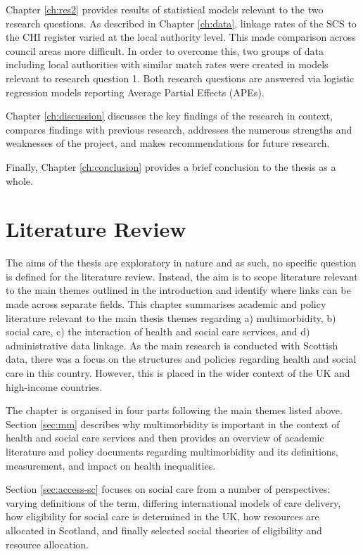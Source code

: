 \documentclass[12pt,a4paper,oneside,table]{report}
\begin{document}
Chapter \ref{ch:res2} provides results of statistical models relevant to
the two research questions. As described in Chapter \ref{ch:data},
linkage rates of the SCS to the CHI register varied at the local
authority level. This made comparison across council areas more
difficult. In order to overcome this, two groups of data including local
authorities with similar match rates were created in models relevant to
research question 1. Both research questions are answered via logistic
regression models reporting Average Partial Effects (APEs).

Chapter \ref{ch:discussion} discusses the key findings of the research
in context, compares findings with previous research, addresses the
numerous strengths and weaknesses of the project, and makes
recommendations for future research.

Finally, Chapter \ref{ch:conclusion} provides a brief conclusion to the
thesis as a whole.

\FloatBarrier
\newpage

\chapter{Literature Review}\label{ch:lit-review}
\thispagestyle{empty}

The aims of the thesis are exploratory in nature and as such, no
specific question is defined for the literature review. Instead, the aim
is to scope literature relevant to the main themes outlined in the
introduction and identify where links can be made across separate
fields. This chapter summarises academic and policy literature relevant
to the main thesis themes regarding a) multimorbidity, b) social care,
c) the interaction of health and social care services, and d)
administrative data linkage. As the main research is conducted with
Scottish data, there was a focus on the structures and policies
regarding health and social care in this country. However, this is
placed in the wider context of the UK and high-income countries.

The chapter is organised in four parts following the main themes listed
above. Section \ref{sec:mm} describes why multimorbidity is important in
the context of health and social care services and then provides an
overview of academic literature and policy documents regarding
multimorbidity and its definitions, measurement, and impact on health
inequalities.

Section \ref{sec:access-sc} focuses on social care from a number of
perspectives: varying definitions of the term, differing international
models of care delivery, how eligibility for social care is determined
in the UK, how resources are allocated in Scotland, and finally selected
social theories of eligibility and resource allocation.
\end{document}
